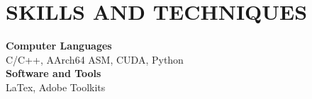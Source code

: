 \section*{SKILLS AND TECHNIQUES}

\noindent
\textbf{Computer Languages} \\
C/C++, AArch64 ASM, CUDA, Python \\

\noindent
\textbf{Software and Tools} \\
LaTex, Adobe Toolkits \\
